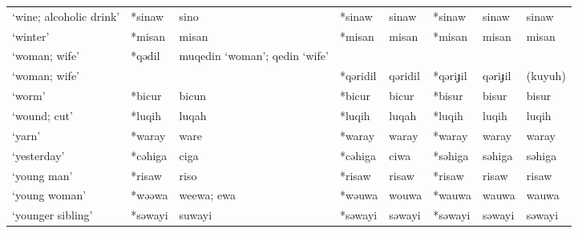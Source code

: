 \begin{landscape}
\begin{longtable}[c]{@{}p{3cm}<{\raggedright}p{2.75cm}<{\raggedright}p{2.75cm}<{\raggedright}p{2.75cm}<{\raggedright}p{2.75cm}<{\raggedright}p{2.75cm}<{\raggedright}p{2.75cm}<{\raggedright}p{2.75cm}<{\raggedright}@{}}
`wine; alcoholic drink'                              & *sinaw             & sino                           & *sinaw             & sinaw                      & *sinaw           & sinaw                    & sinaw                             \\
`winter'                                             & *misan             & misan                          & *misan             & misan                      & *misan           & misan                    & misan                             \\
`woman; wife' & *qədil & muqedin `woman'; qedin `wife' &          &         &          &         &         \\
`woman; wife' &        &                               & *qəridil & qəridil & *qəriɟil & qəriɟil & (kuyuh) \\
`worm'                                               & *bicur             & bicun                          & *bicur             & bicur                      & *bisur           & bisur                    & bisur                             \\
`wound; cut'                                         & *luqih             & luqah                          & *luqih             & luqah                      & *luqih           & luqih                    & luqih                             \\
`yarn'                                               & *waray             & ware                           & *waray             & waray                      & *waray           & waray                    & waray                             \\
`yesterday'                                          & *cəhiga            & ciga                           & *cəhiga            & ciwa                       & *səhiga          & səhiga                   & səhiga                            \\
`young man'                                          & *risaw             & riso                           & *risaw             & risaw                      & *risaw           & risaw                    & risaw                             \\
`young woman'                                        & *wəəwa             & weewa; ewa                     & *wəuwa             & wouwa                      & *wauwa           & wauwa                    & wauwa                             \\
`younger sibling'                                    & *səwayi            & suwayi                         & *səwayi            & səwayi                     & *səwayi          & səwayi                   & səwayi                           \\* 

\end{longtable}

        
\end{landscape}